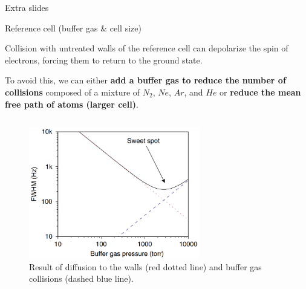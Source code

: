 \begin{frame}[standout]
    Extra slides
\end{frame}



\begin{frame}{Reference cell (buffer gas \& cell size)}

    Collision with untreated walls of the reference cell can depolarize the spin of electrons, forcing them to return to the ground state.

    To avoid this, we can either \textbf{add a buffer gas to reduce the number of collisions} composed of a mixture of $N_2$, $Ne$, $Ar$, and $He$ or \textbf{reduce the mean free path of atoms (larger cell)}.

    \begin{columns}[c, onlytextwidth]

        \begin{column}{0.5\textwidth}

            \begin{figure}
                \centering
                \includegraphics[width=0.7\textwidth]{img/extra-cell-pressure.png}
                \caption{Result of diffusion to the walls (red dotted line) and buffer gas collisions (dashed blue line).}
            \end{figure}

        \end{column}

        \begin{column}{0.5\textwidth}


\end{column}
\end{columns}
\end{frame}
